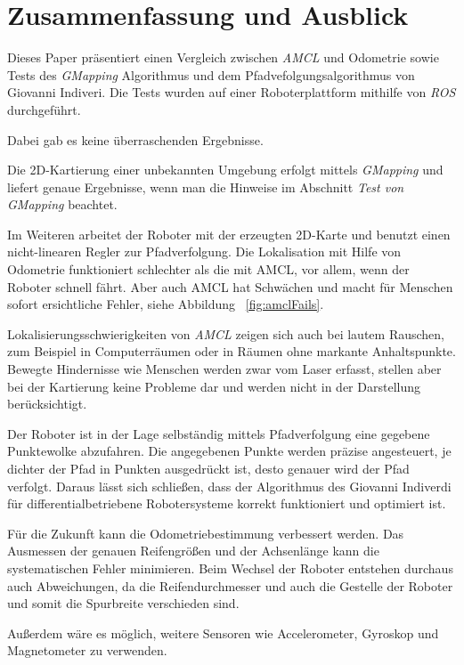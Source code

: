 \documentclass[11pt,a4paper]{article}
\begin{document}
{\section{Zusammenfassung und Ausblick}

Dieses Paper pr\"asentiert einen Vergleich zwischen \textit{AMCL} und Odometrie sowie Tests des \textit{GMapping} Algorithmus und dem Pfadvefolgungsalgorithmus von Giovanni Indiveri. Die Tests wurden auf einer Roboterplattform mithilfe von \textit{ROS} durchgef\"uhrt. 


Dabei gab es keine \"uberraschenden Ergebnisse.

Die 2D-Kartierung einer unbekannten Umgebung erfolgt mittels \textit{GMapping} und liefert genaue Ergebnisse, wenn man die Hinweise im Abschnitt  \textit{Test von GMapping}  beachtet.


Im Weiteren arbeitet der Roboter mit der erzeugten 2D-Karte und benutzt einen nicht-linearen Regler zur Pfadverfolgung.
Die Lokalisation mit Hilfe von Odometrie funktioniert schlechter als die mit AMCL, vor allem, wenn der Roboter schnell f\"ahrt. Aber auch AMCL hat Schw\"achen und macht f\"ur Menschen sofort ersichtliche Fehler, siehe Abbildung  ~\ref{fig:amclFails}.

Lokalisierungsschwierigkeiten von \textit{AMCL} zeigen sich auch bei lautem Rauschen, zum Beispiel in Computerr\"aumen oder in R\"aumen ohne markante Anhaltspunkte. Bewegte Hindernisse wie Menschen werden zwar vom Laser erfasst, stellen aber bei der Kartierung keine Probleme dar und werden nicht in der Darstellung ber\"ucksichtigt. 

Der Roboter ist in der Lage selbst\"andig mittels Pfadverfolgung eine gegebene Punktewolke abzufahren. Die angegebenen Punkte werden pr\"azise angesteuert, je dichter der Pfad in Punkten ausgedr\"uckt ist, desto genauer wird der Pfad verfolgt. Daraus l\"asst sich schlie{\ss}en, dass der Algorithmus des Giovanni Indiverdi f\"ur differentialbetriebene Robotersysteme korrekt funktioniert und optimiert ist.

F\"ur die Zukunft kann die Odometriebestimmung verbessert werden. Das Ausmessen der genauen Reifengr\"o{\ss}en und der Achsenl\"ange kann die systematischen Fehler minimieren. 
Beim Wechsel der Roboter entstehen durchaus auch Abweichungen, da die Reifendurchmesser und auch die Gestelle der Roboter und somit die Spurbreite verschieden sind.

Au{\ss}erdem w\"are es m\"oglich, weitere Sensoren wie Accelerometer, Gyroskop und Magnetometer zu verwenden. 

}
\end{document}
